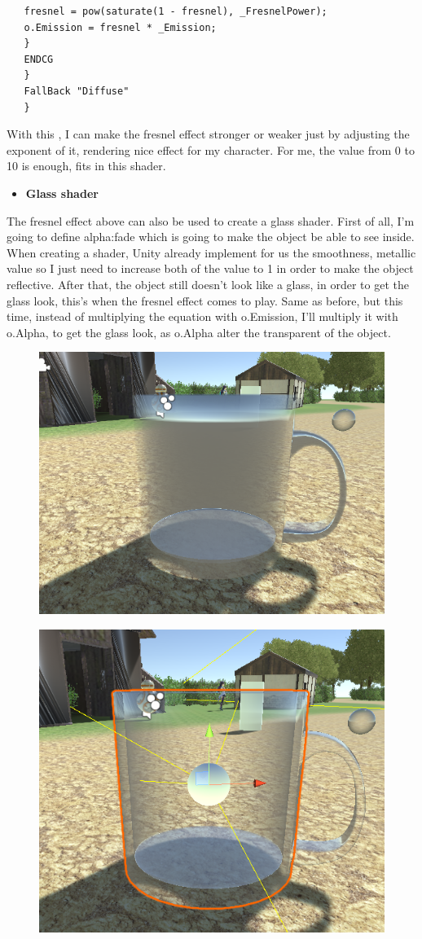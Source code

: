 \documentclass[a4paper, 13pt]{extarticle}
\begin{document}
{\begin{lstlisting}
   fresnel = pow(saturate(1 - fresnel), _FresnelPower);
   o.Emission = fresnel * _Emission;
   }
   ENDCG							  
   } 
   FallBack "Diffuse"
   }
   \end{lstlisting}
  With this , I can make the fresnel effect stronger or weaker just by adjusting the exponent of it, rendering nice effect for my character. For me, the value from 0 to 10 is enough, fits in this shader.
   \begin{itemize}
  	\item \bfseries Glass shader
  \end{itemize}  
  	The fresnel effect above can also be used to create a glass shader. First of all, I'm going to define alpha:fade which is going to make the object be able to see inside. When creating a shader, Unity already implement for us the smoothness, metallic value so I just need to increase both of the value to 1 in order to make the object reflective. After that, the object still doesn't look like a glass, in order to get the glass look, this's when the fresnel effect comes to play. Same as before, but this time, instead of multiplying the equation with o.Emission, I'll multiply it with o.Alpha, to get the glass look, as o.Alpha alter the transparent of the object.
  	\begin{figure}[h]
  		\begin{minipage}{.5\textwidth}
  			\centering
  			\includegraphics[width=0.7\linewidth]{intructions/whole_surface.png}
  			\centering
  			\label{fig:test30}
  		\end{minipage}
  		\begin{minipage}{.5\textwidth}
  			\centering
  			\includegraphics[width=0.6\linewidth]{intructions/from_edge.png}
  			\centering
  			\label{fig:test31}
  		\end{minipage}
  		

\end{figure}}
\end{document}
